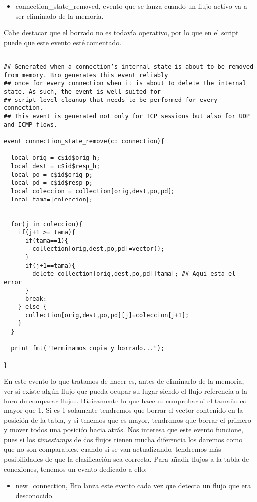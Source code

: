 \begin{itemize}
\item connection\_state\_removed, evento que se lanza cuando un flujo activo va a ser 
eliminado de la memoria.
\end{itemize}

\noindent Cabe destacar que el borrado no es todavía operativo, por lo que en el script puede 
que este evento esté comentado.
\intro
\begin{lstlisting}[style=Codigoc]

## Generated when a connection’s internal state is about to be removed from memory. Bro generates this event reliably
## once for every connection when it is about to delete the internal state. As such, the event is well-suited for
## script-level cleanup that needs to be performed for every connection.
## This event is generated not only for TCP sessions but also for UDP and ICMP flows.

event connection_state_remove(c: connection){

  local orig = c$id$orig_h;
  local dest = c$id$resp_h;
  local po = c$id$orig_p;
  local pd = c$id$resp_p;
  local coleccion = collection[orig,dest,po,pd];
  local tama=|coleccion|;


  for(j in coleccion){
    if(j+1 >= tama){
      if(tama==1){
        collection[orig,dest,po,pd]=vector();
      }
      if(j+1==tama){
        delete collection[orig,dest,po,pd][tama]; ## Aqui esta el error
      }
      break;
    } else {
      collection[orig,dest,po,pd][j]=coleccion[j+1];
    }
  }

  print fmt("Terminamos copia y borrado...");

}

\end{lstlisting}

\noindent En este evento lo que tratamos de hacer es, antes de eliminarlo de 
la memoria, ver si existe algún flujo que pueda ocupar su lugar 
siendo el flujo referencia a la hora de comparar flujos. Básicamente 
lo que hace es comprobar si el tamaño es mayor que 1. Si es 1 solamente 
tendremos que borrar el vector contenido en la posición de la tabla, 
y si tenemos que es mayor, tendremos que borrar el primero y mover todos 
una posición hacia atrás. Nos interesa que este evento funcione, pues 
si los \textit{timestamps} de dos flujos tienen mucha diferencia los daremos 
como que no son comparables, cuando si se van actualizando, tendremos más 
posibilidades de que la clasificación sea correcta.
\intro
Para añadir flujos a la tabla de conexiones, tenemos un evento 
dedicado a ello:
\intro
\begin{itemize}
\item new\_connection, Bro lanza este evento cada vez que detecta un flujo que era desconocido.
\end{itemize}

